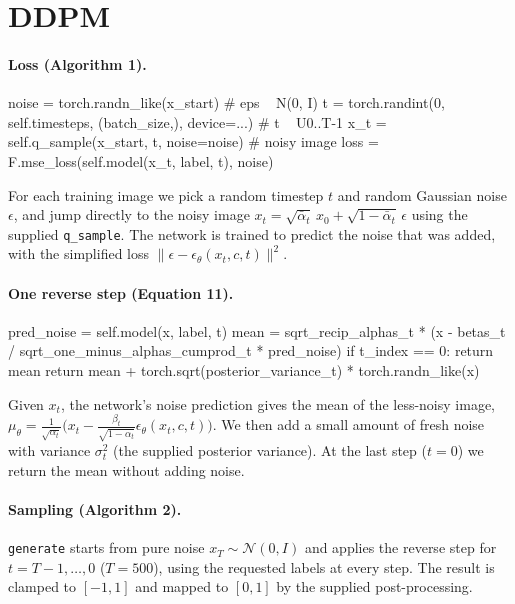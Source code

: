 \documentclass[11pt]{article}
\begin{document}
\section{DDPM}
\paragraph{Loss (Algorithm 1).}\mbox{}
\begin{codeblock}
noise = torch.randn_like(x_start)                               # eps ~ N(0, I)
t = torch.randint(0, self.timesteps, (batch_size,), device=...) # t ~ U{0..T-1}
x_t = self.q_sample(x_start, t, noise=noise)                    # noisy image
loss = F.mse_loss(self.model(x_t, label, t), noise)
\end{codeblock}
For each training image we pick a random timestep $t$ and random Gaussian noise $\epsilon$, and jump
directly to the noisy image $x_t=\sqrt{\bar\alpha_t}\,x_0+\sqrt{1-\bar\alpha_t}\,\epsilon$ using the
supplied \texttt{q\_sample}. The network is trained to predict the noise that was added, with the
simplified loss $\|\epsilon-\epsilon_\theta(x_t,c,t)\|^2$.

\paragraph{One reverse step (Equation 11).}\mbox{}
\begin{codeblock}
pred_noise = self.model(x, label, t)
mean = sqrt_recip_alphas_t * (x - betas_t / sqrt_one_minus_alphas_cumprod_t * pred_noise)
if t_index == 0:
    return mean
return mean + torch.sqrt(posterior_variance_t) * torch.randn_like(x)
\end{codeblock}
Given $x_t$, the network's noise prediction gives the mean of the less-noisy image,
$\mu_\theta=\frac{1}{\sqrt{\alpha_t}}\big(x_t-\frac{\beta_t}{\sqrt{1-\bar\alpha_t}}\epsilon_\theta(x_t,c,t)\big)$.
We then add a small amount of fresh noise with variance $\sigma_t^2$ (the supplied posterior variance).
At the last step ($t=0$) we return the mean without adding noise.

\paragraph{Sampling (Algorithm 2).} \texttt{generate} starts from pure noise $x_T\sim\mathcal N(0,I)$ and
applies the reverse step for $t=T-1,\dots,0$ ($T=500$), using the requested labels at every step.
The result is clamped to $[-1,1]$ and mapped to $[0,1]$ by the supplied post-processing.
\end{document}
